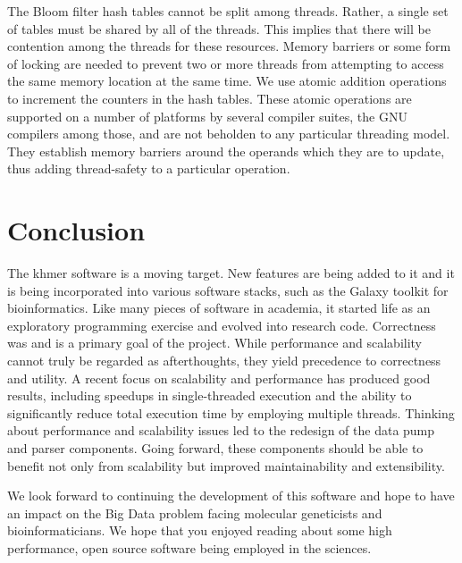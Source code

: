 \documentclass{article}
\begin{document}
The Bloom filter hash tables cannot be split among threads. Rather, a single set of tables must be shared by all of the threads. This implies that there will be contention among the threads for these resources. Memory barriers or some form of locking are needed to prevent two or more threads from attempting to access the same memory location at the same time. We use atomic addition operations to increment the counters in the hash tables. These atomic operations are supported on a number of platforms by several compiler suites, the GNU compilers among those, and are not beholden to any particular threading model. They establish memory barriers around the operands which they are to update, thus adding thread-safety to a particular operation.



\section{Conclusion}

The khmer software is a moving target. New features are being added to it and it is being incorporated into various software stacks, such as the Galaxy toolkit for bioinformatics. Like many pieces of software in academia, it started life as an exploratory programming exercise and evolved into research code. Correctness was and is a primary goal of the project. While performance and scalability cannot truly be regarded as afterthoughts, they yield precedence to correctness and utility. A recent focus on scalability and performance has produced good results, including speedups in single-threaded execution and the ability to significantly reduce total execution time by employing multiple threads. Thinking about performance and scalability issues led to the redesign of the data pump and parser components. Going forward, these components should be able to benefit not only from scalability but improved maintainability and extensibility.

We look forward to continuing the development of this software and hope to have an impact on the Big Data problem facing molecular geneticists and bioinformaticians. We hope that you enjoyed reading about some high performance, open source software being employed in the sciences.




\end{document}
